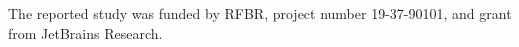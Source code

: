\documentclass[sigconf,table]{acmart}
\begin{document}
	\maketitle










\begin{acks}
The reported study was funded by RFBR, project number 19-37-90101, and grant from JetBrains Research.
\end{acks}

%



%

\appendix



\end{document}
